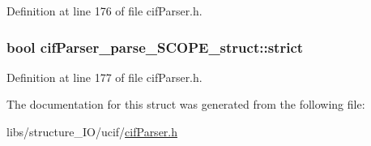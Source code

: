 Definition at line 176 of file cif\-Parser.\-h.

\hypertarget{structcif_parser__parse___s_c_o_p_e__struct_a41a8896fd06a1a6bef379ff2ec36d932}{
\subsubsection[{strict}]{\setlength{\rightskip}{0pt plus 5cm}bool cif\-Parser\-\_\-parse\-\_\-\-S\-C\-O\-P\-E\-\_\-struct\-::strict}}\label{structcif_parser__parse___s_c_o_p_e__struct_a41a8896fd06a1a6bef379ff2ec36d932}


Definition at line 177 of file cif\-Parser.\-h.



The documentation for this struct was generated from the following file\-:\begin{DoxyCompactItemize}
\item 
libs/structure\-\_\-\-I\-O/ucif/\hyperlink{cif_parser_8h}{cif\-Parser.\-h}\end{DoxyCompactItemize}
